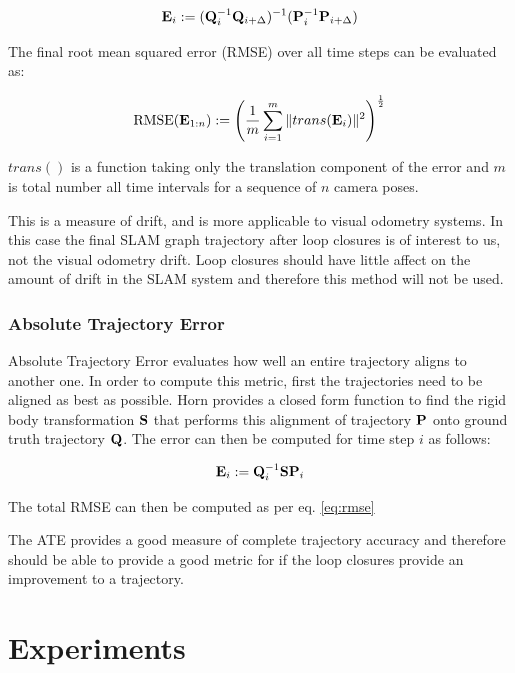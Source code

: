 \begin{equation}
 \mathbf E_i := (\mathbf Q_i^{-1} \mathbf Q_{i+\Delta})^{-1}(\mathbf P_i^{-1} \mathbf P_{i+\Delta})
\end{equation}

The final root mean squared error (RMSE) over all time steps can be evaluated as:

\begin{equation}
 \text{RMSE}(\mathbf E_{1:n}) := \left( \dfrac{1}{m}\displaystyle\sum\limits_{i=1}^m \| trans(\mathbf E_i) \| ^2 \right)^\frac{1}{2}
 \label{eq:rmse}
\end{equation}

$trans()$ is a function taking only the translation component of the error and $m$ is total number all time intervals for a sequence of $n$ camera poses. 

This is a measure of drift, and is more applicable to visual odometry systems.  In this case the final SLAM graph trajectory after loop closures is of interest to us, not the visual odometry drift.  Loop closures should have little affect on the amount of drift in the SLAM system and therefore this method will not be used.

\subsubsection{Absolute Trajectory Error}

Absolute Trajectory Error evaluates how well an entire trajectory aligns to another one.  In order to compute this metric, first the trajectories need to be aligned as best as possible.  Horn\cite{Horn87} provides a closed form function to find the rigid body transformation $\mathbf S$ that performs this alignment of trajectory $\mathbf P$ onto ground truth trajectory $\mathbf Q$.  The error can then be computed for time step $i$ as follows:

\begin{equation}
 \mathbf E_i := \mathbf Q_i^{-1}\mathbf S \mathbf P_i
\end{equation}

The total RMSE can then be computed as per eq. \ref{eq:rmse}

The ATE provides a good measure of complete trajectory accuracy and therefore should be able to provide a good metric for if the loop closures provide an improvement to a trajectory.

\section{Experiments}

